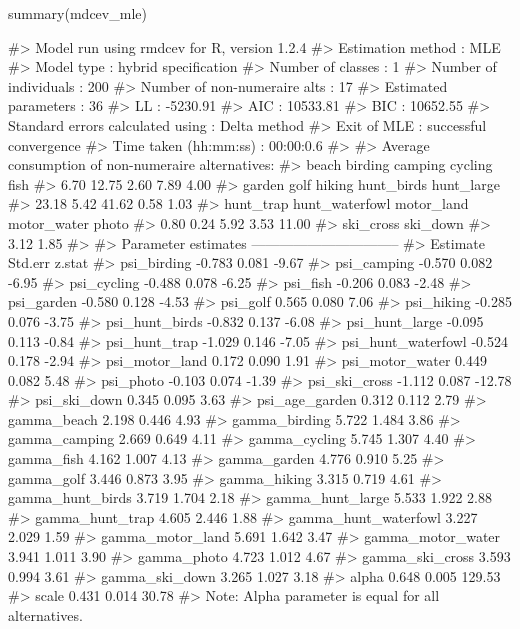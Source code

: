 \begin{example}
summary(mdcev_mle)

#> Model run using rmdcev for R, version 1.2.4 
#> Estimation method                : MLE
#> Model type                       : hybrid specification
#> Number of classes                : 1
#> Number of individuals            : 200
#> Number of non-numeraire alts     : 17
#> Estimated parameters             : 36
#> LL                               : -5230.91
#> AIC                              : 10533.81
#> BIC                              : 10652.55
#> Standard errors calculated using : Delta method
#> Exit of MLE                      : successful convergence
#> Time taken (hh:mm:ss)            : 00:00:0.6
#> 
#> Average consumption of non-numeraire alternatives:
#>          beach        birding        camping        cycling           fish 
#>           6.70          12.75           2.60           7.89           4.00 
#>         garden           golf         hiking     hunt_birds     hunt_large 
#>          23.18           5.42          41.62           0.58           1.03 
#>      hunt_trap hunt_waterfowl     motor_land    motor_water          photo 
#>           0.80           0.24           5.92           3.53          11.00 
#>      ski_cross       ski_down 
#>           3.12           1.85 
#> 
#> Parameter estimates --------------------------------  
#>                      Estimate Std.err z.stat
#> psi_birding            -0.783   0.081  -9.67
#> psi_camping            -0.570   0.082  -6.95
#> psi_cycling            -0.488   0.078  -6.25
#> psi_fish               -0.206   0.083  -2.48
#> psi_garden             -0.580   0.128  -4.53
#> psi_golf                0.565   0.080   7.06
#> psi_hiking             -0.285   0.076  -3.75
#> psi_hunt_birds         -0.832   0.137  -6.08
#> psi_hunt_large         -0.095   0.113  -0.84
#> psi_hunt_trap          -1.029   0.146  -7.05
#> psi_hunt_waterfowl     -0.524   0.178  -2.94
#> psi_motor_land          0.172   0.090   1.91
#> psi_motor_water         0.449   0.082   5.48
#> psi_photo              -0.103   0.074  -1.39
#> psi_ski_cross          -1.112   0.087 -12.78
#> psi_ski_down            0.345   0.095   3.63
#> psi_age_garden          0.312   0.112   2.79
#> gamma_beach             2.198   0.446   4.93
#> gamma_birding           5.722   1.484   3.86
#> gamma_camping           2.669   0.649   4.11
#> gamma_cycling           5.745   1.307   4.40
#> gamma_fish              4.162   1.007   4.13
#> gamma_garden            4.776   0.910   5.25
#> gamma_golf              3.446   0.873   3.95
#> gamma_hiking            3.315   0.719   4.61
#> gamma_hunt_birds        3.719   1.704   2.18
#> gamma_hunt_large        5.533   1.922   2.88
#> gamma_hunt_trap         4.605   2.446   1.88
#> gamma_hunt_waterfowl    3.227   2.029   1.59
#> gamma_motor_land        5.691   1.642   3.47
#> gamma_motor_water       3.941   1.011   3.90
#> gamma_photo             4.723   1.012   4.67
#> gamma_ski_cross         3.593   0.994   3.61
#> gamma_ski_down          3.265   1.027   3.18
#> alpha                   0.648   0.005 129.53
#> scale                   0.431   0.014  30.78
#> Note: Alpha parameter is equal for all alternatives.
\end{example}

